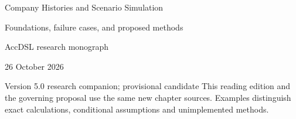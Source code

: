 \documentclass[11pt,a4paper]{report}
\begin{document}
\hypersetup{pageanchor=false}
\begin{titlepage}
{\Huge Company Histories and Scenario Simulation\par}
\vspace{12mm}
{\Large Foundations, failure cases, and proposed methods\par}
\vspace{8mm}
AccDSL research monograph\par 26 October 2026\par Version 5.0 research companion; provisional candidate
\vfill
This reading edition and the governing proposal use the same new chapter sources. Examples distinguish exact calculations, conditional assumptions and unimplemented methods.
\end{titlepage}
\hypersetup{pageanchor=true}
\tableofcontents
\clearpage{}


























\clearpage\label{sim:body-end}

\begingroup\raggedright
\endgroup
\end{document}
